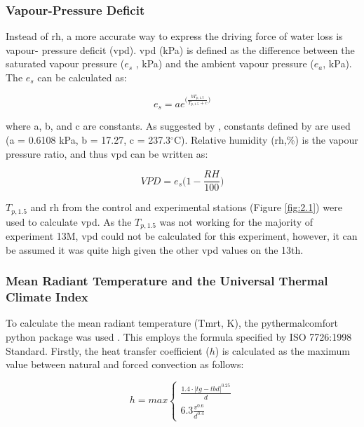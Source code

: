 \documentclass[final,3p,times,authoryear]{elsarticle}
\begin{document}
\subsubsection{Vapour-Pressure Deficit}\label{sec:appendix7.4.3}

Instead of \gls{rh}, a more accurate way to express the driving force of water loss is vapour-
pressure deficit (\gls{vpd}). \gls{vpd} (kPa) is defined as the difference between the saturated
vapour pressure ($e_{s}$ , kPa) and the ambient vapour pressure ($e_{a}$, kPa).
The $e_{s}$ can be calculated as:

\begin{equation}
e_{s} = a e^{\bigg(  \frac{  bT_{p,1.5}   }{ T_{p,1.5} + c }    \bigg)}
\label{eq:7.7}
\end{equation}

where a, b, and c are constants. As suggested by \cite{McMahon2013}, constants defined by \cite{Allen1998} are used (a = 0.6108 kPa, b = 17.27, c = 237.3$^{\circ}$C). Relative humidity (\gls{rh},\%) is the vapour pressure ratio, and thus \gls{vpd} can be written as:

\begin{equation}
VPD=e_{s}\bigg( 1 - \frac{RH}{100} \bigg)
\label{eq:7.8}
\end{equation}

$T_{p,1.5}$ and \gls{rh} from the control and experimental stations (Figure \ref{fig:2.1}) were used to calculate \gls{vpd}. As the $T_{p,1.5}$ was not working for the majority of experiment 13M, \gls{vpd} could not be calculated for this experiment, however, it can be assumed it was quite high given the other \gls{vpd} values on the 13th.


\subsubsection{Mean Radiant Temperature and the Universal Thermal Climate Index}\label{sec:appendix7.4.4}

To calculate the mean radiant temperature (\gls{Tmrt}, K), the pythermalcomfort python package was used \citep{Tartarini2020}. This employs the formula specified by ISO 7726:1998 Standard. Firstly, the heat transfer coefficient ($h$) is calculated as the maximum value between natural and forced convection as follows:

\begin{equation}
h = max \begin{cases}  \frac{  1.4 \cdot |tg-tbd|^{0.25} }{d} \\  6.3 \frac{v^{0.6}}{d^{0.4}} \end{cases}
\label{eq:7.9}
\end{equation}
\end{document}
